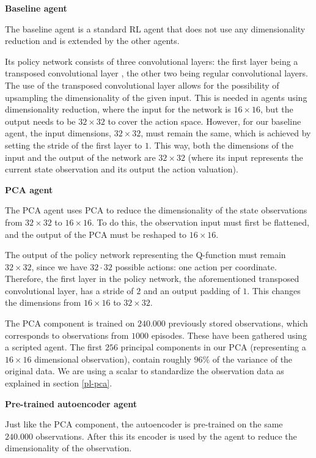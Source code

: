\noindent \textbf{Baseline agent}\par
\noindent The baseline agent is a standard RL agent that does not use any dimensionality reduction and is extended by the other agents.

Its policy network consists of three convolutional layers: the first layer being a transposed convolutional layer \cite{transpose}, the other two being regular convolutional layers. The use of the transposed convolutional layer allows for the possibility of upsampling the dimensionality of the given input. This is needed in agents using dimensionality reduction, where the input for the network is $16 \times 16$, but the output needs to be $32 \times 32$ to cover the action space. However, for our baseline agent, the input dimensions, $32 \times 32$, must remain the same, which is achieved by setting the stride of the first layer to $1$. This way, both the dimensions of the input and the output of the network are $32 \times 32$ (where its input represents the current state observation and its output the action valuation).\par

\noindent \textbf{PCA agent}\par
\noindent The PCA agent uses PCA to reduce the dimensionality of the state observations from $32 \times 32$ to $16 \times 16$. To do this, the observation input must first be flattened, and the output of the PCA must be reshaped to $16 \times 16$.

The output of the policy network representing the Q-function must remain $32 \times 32$, since we have $32 \cdot 32$ possible actions: one action per coordinate. Therefore, the first layer in the policy network, the aforementioned transposed convolutional layer, has a stride of $2$ and an output padding of $1$. This changes the dimensions from $16 \times 16$ to $32 \times 32$. 

The PCA component is trained on $240.000$ previously stored observations, which corresponds to observations from $1000$ episodes. These have been gathered using a scripted agent. The first $256$ principal components in our PCA (representing a $16 \times 16$ dimensional observation), contain roughly $96\%$ of the variance of the original data. We are using a scalar to standardize the observation data as explained in section \ref{pl-pca}. \par

\noindent \textbf{Pre-trained autoencoder agent}\par
\noindent Just like the PCA component, the autoencoder is pre-trained on the same $240.000$ observations. After this its encoder is used by the agent to reduce the dimensionality of the observation. 

